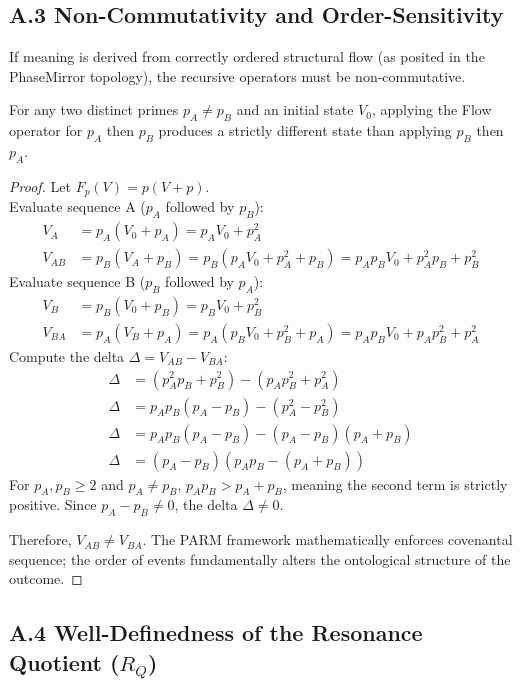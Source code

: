 \documentclass[11pt]{article}
\begin{document}
\subsection*{A.3 Non-Commutativity and Order-Sensitivity}

If meaning is derived from correctly ordered structural flow (as posited in the PhaseMirror topology), the recursive operators must be non-commutative.

\begin{theorem}
For any two distinct primes $p_A \neq p_B$ and an initial state $V_0$, applying the Flow operator for $p_A$ then $p_B$ produces a strictly different state than applying $p_B$ then $p_A$. 
\end{theorem}

\begin{proof}
Let $F_p(V) = p(V + p)$. \\
Evaluate sequence A ($p_A$ followed by $p_B$):
\begin{align*}
V_A &= p_A(V_0 + p_A) = p_A V_0 + p_A^2 \\
V_{AB} &= p_B(V_A + p_B) = p_B(p_A V_0 + p_A^2 + p_B) = p_A p_B V_0 + p_A^2 p_B + p_B^2
\end{align*}
Evaluate sequence B ($p_B$ followed by $p_A$):
\begin{align*}
V_B &= p_B(V_0 + p_B) = p_B V_0 + p_B^2 \\
V_{BA} &= p_A(V_B + p_A) = p_A(p_B V_0 + p_B^2 + p_A) = p_A p_B V_0 + p_A p_B^2 + p_A^2
\end{align*}
Compute the delta $\Delta = V_{AB} - V_{BA}$:
\begin{align*}
\Delta &= (p_A^2 p_B + p_B^2) - (p_A p_B^2 + p_A^2) \\
\Delta &= p_A p_B (p_A - p_B) - (p_A^2 - p_B^2) \\
\Delta &= p_A p_B (p_A - p_B) - (p_A - p_B)(p_A + p_B) \\
\Delta &= (p_A - p_B)(p_A p_B - (p_A + p_B))
\end{align*}
For $p_A, p_B \ge 2$ and $p_A \neq p_B$, $p_A p_B > p_A + p_B$, meaning the second term is strictly positive. Since $p_A - p_B \neq 0$, the delta $\Delta \neq 0$. 

Therefore, $V_{AB} \neq V_{BA}$. The PARM framework mathematically enforces covenantal sequence; the order of events fundamentally alters the ontological structure of the outcome.
\end{proof}

\subsection*{A.4 Well-Definedness of the Resonance Quotient ($R_Q$)}
\end{document}
